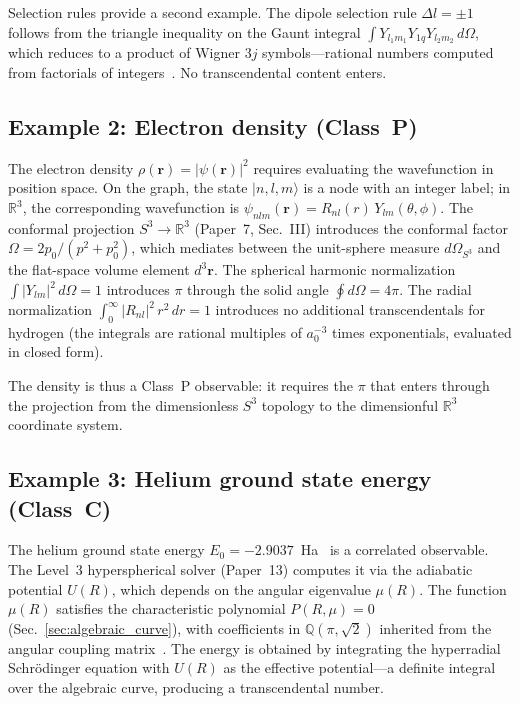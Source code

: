 \documentclass[aps,pra,twocolumn,superscriptaddress,longbibliography]{revtex4-2}
\begin{document}
Selection rules provide a second example.  The dipole selection
rule $\Delta l = \pm 1$ follows from the triangle inequality
on the Gaunt integral
$\int Y_{l_1 m_1} Y_{1q} Y_{l_2 m_2}\,d\Omega$, which
reduces to a product of Wigner $3j$ symbols---rational numbers
computed from factorials of integers~\cite{loutey_paper0}.
No transcendental content enters.

\subsection{Example 2: Electron density (Class~P)}

The electron density $\rho(\mathbf{r}) = |\psi(\mathbf{r})|^2$
requires evaluating the wavefunction in position space.  On the
graph, the state $|n, l, m\rangle$ is a node with an integer
label; in $\mathbb{R}^3$, the corresponding wavefunction is
$\psi_{nlm}(\mathbf{r}) = R_{nl}(r)\,Y_{lm}(\theta,\phi)$.
The conformal projection $S^3 \to \mathbb{R}^3$ (Paper~7,
Sec.~III) introduces the conformal factor
$\Omega = 2p_0/(p^2 + p_0^2)$, which mediates between the
unit-sphere measure $d\Omega_{S^3}$ and the flat-space volume
element $d^3\mathbf{r}$.  The spherical harmonic normalization
$\int |Y_{lm}|^2\,d\Omega = 1$ introduces $\pi$ through the
solid angle $\oint d\Omega = 4\pi$.  The radial normalization
$\int_0^\infty |R_{nl}|^2\,r^2\,dr = 1$ introduces no additional
transcendentals for hydrogen (the integrals are rational multiples
of $a_0^{-3}$ times exponentials, evaluated in closed form).

The density is thus a Class~P observable: it requires the $\pi$
that enters through the projection from the dimensionless $S^3$
topology to the dimensionful $\mathbb{R}^3$ coordinate system.

\subsection{Example 3: Helium ground state energy (Class~C)}

The helium ground state energy $E_0 = -2.9037$~Ha~\cite{drake2006}
is a correlated observable.  The Level~3 hyperspherical solver
(Paper~13) computes it via the adiabatic potential $U(R)$, which
depends on the angular eigenvalue $\mu(R)$.  The function $\mu(R)$
satisfies the characteristic polynomial $P(R,\mu) = 0$
(Sec.~\ref{sec:algebraic_curve}), with coefficients in
$\mathbb{Q}(\pi, \sqrt{2})$ inherited from the angular coupling
matrix~\cite{loutey_track_p1}.  The energy is obtained by
integrating the hyperradial Schr\"odinger equation with
$U(R)$ as the effective potential---a definite integral over
the algebraic curve, producing a transcendental number.
\end{document}
